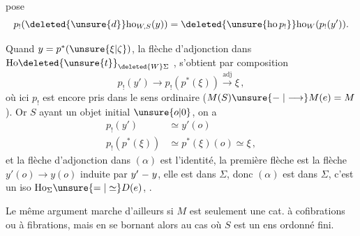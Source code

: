 pose
\[
p_!(\deleted{\unsure{d}}\mathrm{ho}_{W,S}(y))=
\deleted{\unsure{\mathrm{ho}\,p_!}}\mathrm{ho}_W(p_!(y')) .
\]

Quand $y=p^*(\unsure{\xi|\zeta})$, la flèche d'adjonction  dans $\mathrm{Ho}\deleted{\unsure{t}}_{\deleted{W}\Sigma}$ , s'obtient par composition
\begingroup
\makeatletter
\tagsleft@true
\makeatother
\[
p_!(y')\longrightarrow p_!(p^*(\xi))\xrightarrow{\mathrm{adj}}\xi\,,
\tag*{$(\alpha)$}
\]
\endgroup
où ici $p_!$ est encore pris dans le sens ordinaire ($M(S)\unsure{\relbar|\longrightarrow}M(e)=M$). Or $S$ ayant un objet initial $\unsure{o|0}$, on a
\[
\begin{aligned}
p_!(y')&\simeq y'(o)\\
p_!(p^*(\xi))&\simeq p^*(\xi)(o)\simeq\xi\,,
\end{aligned}
\]
et la flèche d'adjonction dans $(\alpha)$ est l'identité, la  première flèche est la flèche $y'(o)\longrightarrow y(o)$ induite par $y'\relbar y$, elle est dans $\Sigma$, donc $(\alpha)$ est dans $\Sigma$,   c'est un iso  $\mathrm{Ho}_{\Sigma}\unsure{=|\simeq}D(e)$, .

Le même argument marche d'ailleurs si $M$ est seulement une cat. à cofibrations ou à fibrations, mais en se bornant alors au cas où $S$ est un ens ordonné fini.

